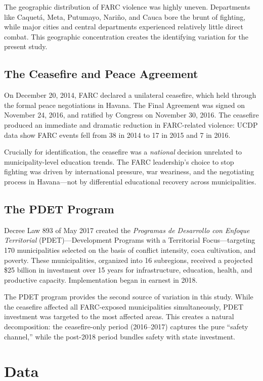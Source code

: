 \documentclass[12pt]{article}
\begin{document}
The geographic distribution of FARC violence was highly uneven. Departments like Caquet\'a, Meta, Putumayo, Nari\~no, and Cauca bore the brunt of fighting, while major cities and central departments experienced relatively little direct combat. This geographic concentration creates the identifying variation for the present study.

\subsection{The Ceasefire and Peace Agreement}

On December 20, 2014, FARC declared a unilateral ceasefire, which held through the formal peace negotiations in Havana. The Final Agreement was signed on November 24, 2016, and ratified by Congress on November 30, 2016. The ceasefire produced an immediate and dramatic reduction in FARC-related violence: UCDP data show FARC events fell from 38 in 2014 to 17 in 2015 and 7 in 2016.

Crucially for identification, the ceasefire was a \emph{national} decision unrelated to municipality-level education trends. The FARC leadership's choice to stop fighting was driven by international pressure, war weariness, and the negotiating process in Havana---not by differential educational recovery across municipalities.

\subsection{The PDET Program}

Decree Law 893 of May 2017 created the \emph{Programas de Desarrollo con Enfoque Territorial} (PDET)---Development Programs with a Territorial Focus---targeting 170 municipalities selected on the basis of conflict intensity, coca cultivation, and poverty. These municipalities, organized into 16 subregions, received a projected \$25 billion in investment over 15 years for infrastructure, education, health, and productive capacity. Implementation began in earnest in 2018.

The PDET program provides the second source of variation in this study. While the ceasefire affected all FARC-exposed municipalities simultaneously, PDET investment was targeted to the most affected areas. This creates a natural decomposition: the ceasefire-only period (2016--2017) captures the pure ``safety channel,'' while the post-2018 period bundles safety with state investment.


\section{Data}
\end{document}

